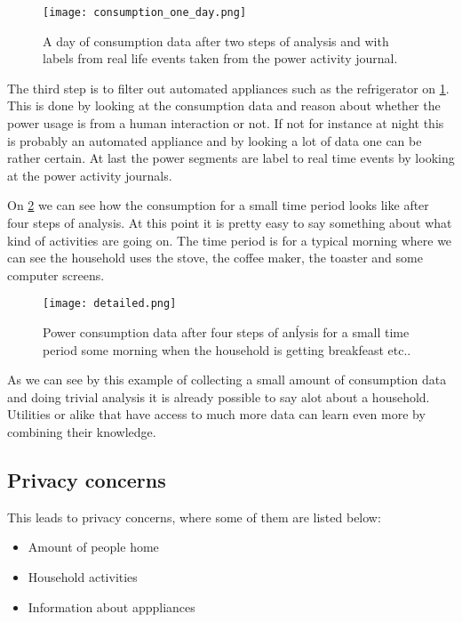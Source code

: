 \begin{figure}
  \begin{center}
    \texttt{[image: consumption\_one\_day.png]}
  \end{center}
  \caption{A day of consumption data after two steps of analysis and with labels from real life events taken from the power activity journal.}
  \label{consumption_one_day}
\end{figure}


The third step is to filter out automated appliances such as the refrigerator on \cref{consumption_one_day}.
This is done by looking at the consumption data and reason about whether the power usage is from a human interaction or not.
If not for instance at night this is probably an automated appliance and by looking a lot of data one can be rather certain.
At last the power segments are label to real time events by looking at the power activity journals.


On \cref{detailed_consumption} we can see how the consumption for a small time period looks like after four steps of analysis.
At this point it is pretty easy to say something about what kind of activities are going on.
The time period is for a typical morning where we can see the household uses the stove, the coffee maker, the toaster and some computer screens.

\begin{figure}
  \begin{center}
    \texttt{[image: detailed.png]}
  \end{center}
  \caption{Power consumption data after four steps of anĺysis for a small time period some morning when the household is getting breakfeast etc..}
  \label{detailed_consumption}
\end{figure}


As we can see by this example of collecting a small amount of consumption data and doing trivial analysis it is already possible to say alot about a household.
Utilities or alike that have access to much more data can learn even more by combining their knowledge.

\subsection{Privacy concerns}
This leads to privacy concerns, where some of them are listed below:
\begin{itemize}
  \item Amount of people home
  \item Household activities
  \item Information about apppliances
\end{itemize}

